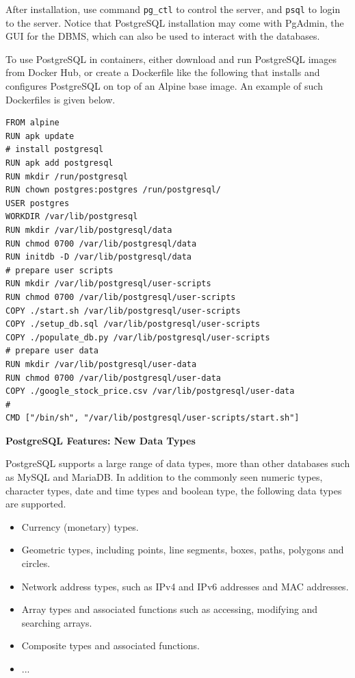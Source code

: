 After installation, use command \verb|pg_ctl| to control the server, and \verb|psql| to login to the server. Notice that PostgreSQL installation may come with PgAdmin, the GUI for the DBMS, which can also be used to interact with the databases. 

To use PostgreSQL in containers, either download and run PostgreSQL images from Docker Hub, or create a Dockerfile like the following that installs and configures PostgreSQL on top of an Alpine base image. An example of such Dockerfiles is given below.
\begin{lstlisting}
FROM alpine
RUN apk update
# install postgresql
RUN apk add postgresql
RUN mkdir /run/postgresql
RUN chown postgres:postgres /run/postgresql/
USER postgres
WORKDIR /var/lib/postgresql
RUN mkdir /var/lib/postgresql/data
RUN chmod 0700 /var/lib/postgresql/data
RUN initdb -D /var/lib/postgresql/data
# prepare user scripts
RUN mkdir /var/lib/postgresql/user-scripts
RUN chmod 0700 /var/lib/postgresql/user-scripts
COPY ./start.sh /var/lib/postgresql/user-scripts
COPY ./setup_db.sql /var/lib/postgresql/user-scripts
COPY ./populate_db.py /var/lib/postgresql/user-scripts
# prepare user data
RUN mkdir /var/lib/postgresql/user-data
RUN chmod 0700 /var/lib/postgresql/user-data
COPY ./google_stock_price.csv /var/lib/postgresql/user-data
#
CMD ["/bin/sh", "/var/lib/postgresql/user-scripts/start.sh"]
\end{lstlisting}


\vspace{0.1in}
\noindent \textbf{PostgreSQL Features: New Data Types}
\vspace{0.1in}

PostgreSQL supports a large range of data types, more than other databases such as MySQL and MariaDB. In addition to the commonly seen numeric types, character types, date and time types and boolean type, the following data types are supported.
\begin{itemize}
	\item Currency (monetary) types.
	\item Geometric types, including points, line segments, boxes, paths, polygons and circles.
	\item Network address types, such as IPv4 and IPv6 addresses and MAC addresses.
	\item Array types and associated functions such as accessing, modifying and searching arrays.
	\item Composite types and associated functions.
	\item ...
\end{itemize}

